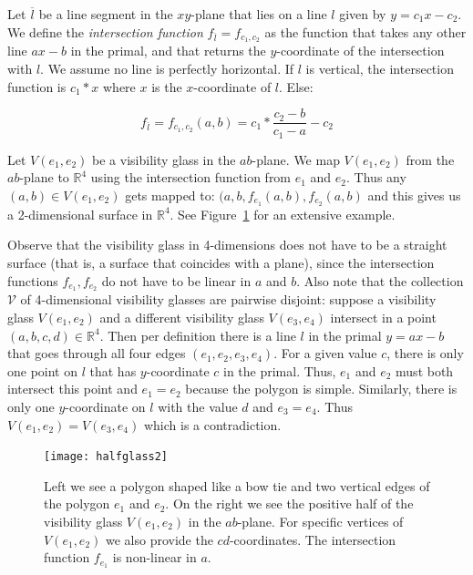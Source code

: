 \documentclass{article}
\begin{document}
Let $\overline{l}$ be a line segment in the $xy$-plane that lies on a line $l$ given by $y = c_1 x - c_2$. We define the \emph{intersection function} $f_{\overline{l}} = f_{c_1, c_2}$ as the function that takes any other line $a x - b$ in the primal, and that returns the $y$-coordinate of the intersection with $l$.  We assume no line is perfectly horizontal. If $l$ is vertical, the intersection function is $c_1*x$ where $x$ is the $x$-coordinate of $l$. Else:

\begin{equation}
f_{\overline{l}} = f_{c_1, c_2}(a,b) = c_1*\frac{c_2 - b}{c_1 - a} - c_2
\end{equation}


Let $V(e_1, e_2)$ be a visibility glass in the $ab$-plane. We map $V(e_1, e_2)$ from the $ab$-plane to $\mathbb{R}^4$ using the intersection function from $e_1$ and $e_2$. Thus any $(a,b) \in V(e_1, e_2)$ gets mapped to: $(a,b, f_{e_1}(a,b), f_{e_2}(a,b)$ and this gives us a 2-dimensional surface in $\mathbb{R}^4$. See Figure~\ref{fig:halfglass2} for an extensive example. 

Observe that the visibility glass in 4-dimensions does not have to be a straight surface (that is, a surface that coincides with a plane), since the intersection functions $f_{e_1}, f_{e_2}$ do not have to be linear in $a$ and $b$. Also note that the collection $\mathcal{V}$ of 4-dimensional visibility glasses are pairwise disjoint: suppose a visibility glass $V(e_1, e_2)$ and a different visibility glass $V(e_3, e_4)$ intersect  in a point $(a,b,c,d) \in \mathbb{R}^4$. Then per definition there is a line $l$ in the primal $y = ax - b$ that goes through all four edges $(e_1, e_2, e_3, e_4)$. For a given value $c$, there is only one point on $l$ that has $y$-coordinate $c$ in the primal. Thus, $e_1$ and $e_2$ must both intersect this point and $e_1 = e_2$ because the polygon is simple. Similarly, there is only one $y$-coordinate on $l$ with the value $d$ and $e_3 = e_4$. Thus $V(e_1, e_2) = V(e_3, e_4)$ which is a contradiction.


\begin{figure}[H]
  \centering
  \texttt{[image: halfglass2]}
  \caption{Left we see a polygon shaped like a bow tie and two vertical edges of the polygon $e_1$ and $e_2$. On the right we see the positive half of the visibility glass $V(e_1, e_2)$ in the $ab$-plane. For specific vertices of $V(e_1, e_2)$ we also provide the $cd$-coordinates. The intersection function $f_{e_1}$ is non-linear in $a$. }
    \label{fig:halfglass2}
\end{figure}
\end{document}
